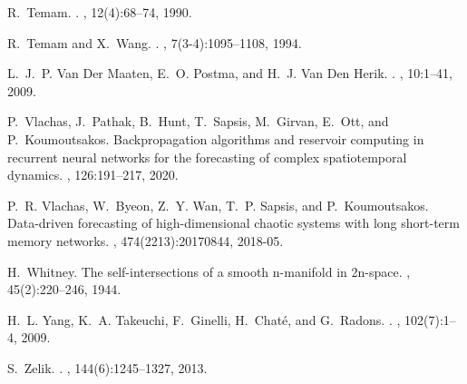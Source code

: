 \documentclass[preprint,aps,pre,letterpaper,onecolumn,superscriptaddress]{revtex4-2} %
\begin{document}
\begin{thebibliography}{10}
R.~Temam.
.
, 12(4):68--74, 1990.

R.~Temam and X.~Wang.
.
, 7(3-4):1095--1108, 1994.

L.~J.~P. {Van Der Maaten}, E.~O. Postma, and H.~J. {Van Den Herik}.
.
, 10:1--41, 2009.

P.~Vlachas, J.~Pathak, B.~Hunt, T.~Sapsis, M.~Girvan, E.~Ott, and
  P.~Koumoutsakos.
\newblock Backpropagation algorithms and reservoir computing in recurrent
  neural networks for the forecasting of complex spatiotemporal dynamics.
, 126:191--217, 2020.

P.~R. Vlachas, W.~Byeon, Z.~Y. Wan, T.~P. Sapsis, and P.~Koumoutsakos.
\newblock Data-driven forecasting of high-dimensional chaotic systems with long
  short-term memory networks.
, 474(2213):20170844, 2018-05.

H.~Whitney.
\newblock The self-intersections of a smooth n-manifold in 2n-space.
, 45(2):220--246, 1944.

H.~L. Yang, K.~A. Takeuchi, F.~Ginelli, H.~Chat{\'{e}}, and G.~Radons.
.
, 102(7):1--4, 2009.

S.~Zelik.
.
, 144(6):1245--1327, 2013.

\end{thebibliography}
\end{document}
